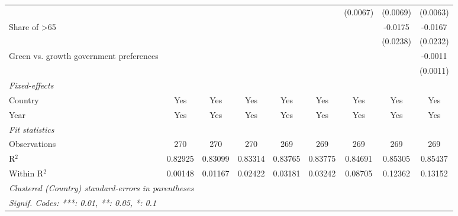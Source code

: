 \begin{table}[htbp]
\begin{tabular}{lcccccccc}
                                                              &          &          &          &          &          & (0.0067) & (0.0069) & (0.0063)\\   
      Share of >65                                            &          &          &          &          &          &          & -0.0175  & -0.0167\\   
                                                              &          &          &          &          &          &          & (0.0238) & (0.0232)\\   
      Green vs. growth government preferences                 &          &          &          &          &          &          &          & -0.0011\\   
                                                              &          &          &          &          &          &          &          & (0.0011)\\   
      \midrule
      \emph{Fixed-effects}\\
      Country                                                 & Yes      & Yes      & Yes      & Yes      & Yes      & Yes      & Yes      & Yes\\  
      Year                                                    & Yes      & Yes      & Yes      & Yes      & Yes      & Yes      & Yes      & Yes\\  
      \midrule
      \emph{Fit statistics}\\
      Observations                                            & 270      & 270      & 270      & 269      & 269      & 269      & 269      & 269\\  
      R$^2$                                                   & 0.82925  & 0.83099  & 0.83314  & 0.83765  & 0.83775  & 0.84691  & 0.85305  & 0.85437\\  
      Within R$^2$                                            & 0.00148  & 0.01167  & 0.02422  & 0.03181  & 0.03242  & 0.08705  & 0.12362  & 0.13152\\  
      \midrule \midrule
      \multicolumn{9}{l}{\emph{Clustered (Country) standard-errors in parentheses}}\\
      \multicolumn{9}{l}{\emph{Signif. Codes: ***: 0.01, **: 0.05, *: 0.1}}\\
   \end{tabular}
\end{table}


